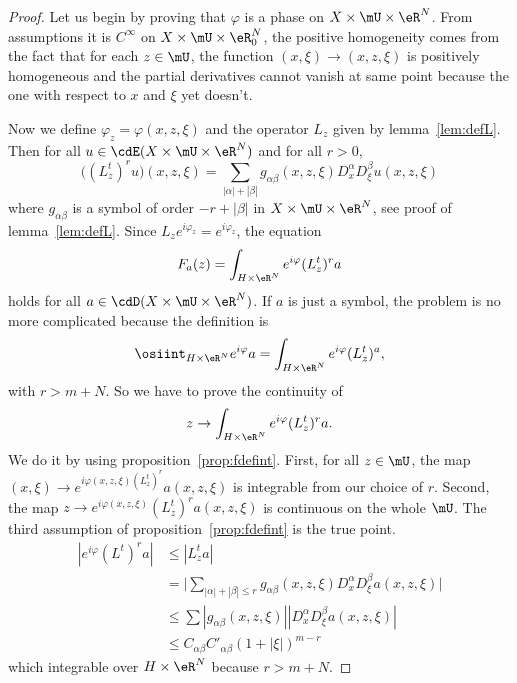 \begin{proof}
	Let us begin by proving that $\varphi$ is a phase on $X\times\mU\times\eR^N$. From assumptions it is $C^{\infty}$ on $X\times\mU\times\eR^N_0$, the positive homogeneity comes from the fact that for each $z\in\mU$, the function $(x,\xi)\to(x,z,\xi)$ is positively homogeneous and the partial derivatives cannot vanish at same point because the one with respect to $x$ and $\xi$ yet doesn't.

	Now we define $\varphi_z=\varphi(x,z,\xi)$ and the operator $L_z$ given by lemma~\ref{lem:defL}. Then for all $u\in\cdE(X\times\mU\times\eR^N)$ and for all $r>0$,
	\[
		\big((L_z^t)^ru\big)(x,z,\xi)=\sum_{| \alpha |+| \beta |}g_{\alpha\beta}(x,z,\xi)D_x^{\alpha}D_{\xi}^{\beta}u(x,z,\xi)
	\]
	where $g_{\alpha\beta}$ is a symbol of order $-r+| \beta |$ in $X\times\mU\times\eR^N$, see proof of lemma~\ref{lem:defL}. Since $L_ze^{i\varphi_z}=e^{i\varphi_z}$, the equation
	\[
		F_a(z)=\int_{H\times\eR^N}e^{i\varphi}(L_z^t)^ra
	\]
	holds for all $a\in\cdD(X\times\mU\times\eR^N)$. If $a$ is just a symbol, the problem is no more complicated because the definition is
	\[
		\osiint_{H\times\eR^N}e^{i\varphi}a=\int_{H\times\eR^N}e^{i\varphi}(L_z^t)^a,
	\]
	with $r>m+N$. So we have to prove the continuity of
	\[
		z\to\int_{H\times\eR^N}e^{i\varphi}(L_z^t)^ra.
	\]
	We do it by using proposition~\ref{prop:fdefint}. First, for all $z\in\mU$, the map $(x,\xi)\to e^{i\varphi(x,z,\xi)(L_z^t)^r}a(x,z,\xi)$ is integrable from our choice of $r$. Second, the map $z\to e^{i\varphi(x,z,\xi)}(L_z^t)^ra(x,z,\xi)$ is continuous on the whole $\mU$. The third assumption of proposition~\ref{prop:fdefint} is the true point.
	\begin{equation}
		\begin{split}
			| e^{i\varphi}(L^t)^ra |	&\leq | L_z^ta |\\
			&=\Big| \sum_{| \alpha |+| \beta |\leq r}g_{\alpha\beta}(x,z,\xi)D_x^{\alpha}D_{\xi}^{\beta}a(x,z,\xi)    \Big|\\
			&\leq \sum | g_{\alpha\beta}(x,z,\xi) | |D_x^{\alpha}D_{\xi}^{\beta}a(x,z,\xi) |\\
			&\leq C_{\alpha\beta}C'_{\alpha\beta}(1+| \xi |)^{m-r}
		\end{split}
	\end{equation}
	which integrable over $H\times\eR^N$ because $r>m+N$.


\end{proof}
